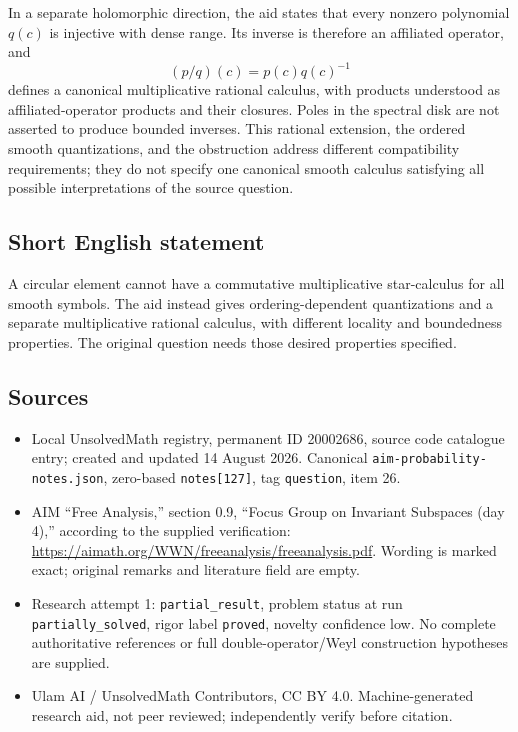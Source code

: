 \documentclass[11pt]{article}
\begin{document}
In a separate holomorphic direction, the aid states that every nonzero polynomial $q(c)$ is injective with dense range. Its inverse is therefore an affiliated operator, and
\[
 (p/q)(c)=p(c)q(c)^{-1}
\]
defines a canonical multiplicative rational calculus, with products understood as affiliated-operator products and their closures. Poles in the spectral disk are not asserted to produce bounded inverses. This rational extension, the ordered smooth quantizations, and the obstruction address different compatibility requirements; they do not specify one canonical smooth calculus satisfying all possible interpretations of the source question.
\subsection{Short English statement}
A circular element cannot have a commutative multiplicative star-calculus for all smooth symbols. The aid instead gives ordering-dependent quantizations and a separate multiplicative rational calculus, with different locality and boundedness properties. The original question needs those desired properties specified.
\subsection{Sources}
\begin{itemize}
\item Local UnsolvedMath registry, permanent ID 20002686, source code catalogue entry; created and updated 14 August 2026. Canonical \texttt{aim-probability-notes.json}, zero-based \texttt{notes[127]}, tag \texttt{question}, item 26.
\item AIM ``Free Analysis,'' section 0.9, ``Focus Group on Invariant Subspaces (day 4),'' according to the supplied verification: \url{https://aimath.org/WWN/freeanalysis/freeanalysis.pdf}. Wording is marked exact; original remarks and literature field are empty.
\item Research attempt 1: \texttt{partial\_result}, problem status at run \texttt{partially\_solved}, rigor label \texttt{proved}, novelty confidence low. No complete authoritative references or full double-operator/Weyl construction hypotheses are supplied.
\item Ulam AI / UnsolvedMath Contributors, CC BY 4.0. Machine-generated research aid, not peer reviewed; independently verify before citation.
\end{itemize}
\end{document}
